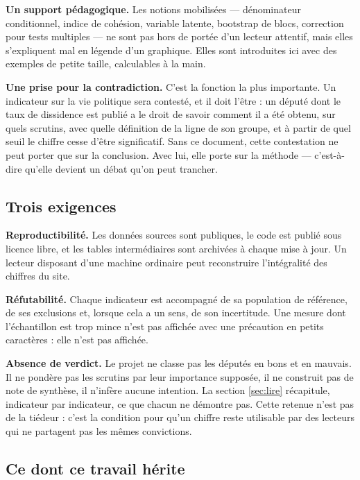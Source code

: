 \documentclass[11pt,a4paper]{article}
\begin{document}
\textbf{Un support pédagogique.} Les notions mobilisées — dénominateur
conditionnel, indice de cohésion, variable latente, bootstrap de blocs,
correction pour tests multiples — ne sont pas hors de portée d'un lecteur
attentif, mais elles s'expliquent mal en légende d'un graphique. Elles sont
introduites ici avec des exemples de petite taille, calculables à la main.

\textbf{Une prise pour la contradiction.} C'est la fonction la plus
importante. Un indicateur sur la vie politique sera contesté, et il doit
l'être : un député dont le taux de dissidence est publié a le droit de savoir
comment il a été obtenu, sur quels scrutins, avec quelle définition de la
ligne de son groupe, et à partir de quel seuil le chiffre cesse d'être
significatif. Sans ce document, cette contestation ne peut porter que sur la
conclusion. Avec lui, elle porte sur la méthode — c'est-à-dire qu'elle devient
un débat qu'on peut trancher.

\subsection{Trois exigences}

\textbf{Reproductibilité.} Les données sources sont publiques, le code est
publié sous licence libre, et les tables intermédiaires sont archivées à
chaque mise à jour. Un lecteur disposant d'une machine ordinaire peut
reconstruire l'intégralité des chiffres du site.

\textbf{Réfutabilité.} Chaque indicateur est accompagné de sa population de
référence, de ses exclusions et, lorsque cela a un sens, de son incertitude.
Une mesure dont l'échantillon est trop mince n'est pas affichée avec une
précaution en petits caractères : elle n'est pas affichée.

\textbf{Absence de verdict.} Le projet ne classe pas les députés en bons et en
mauvais. Il ne pondère pas les scrutins par leur importance supposée, il ne
construit pas de note de synthèse, il n'infère aucune intention. La section
\ref{sec:lire} récapitule, indicateur par indicateur, ce que chacun ne
démontre pas. Cette retenue n'est pas de la tiédeur : c'est la condition pour
qu'un chiffre reste utilisable par des lecteurs qui ne partagent pas les mêmes
convictions.

\subsection{Ce dont ce travail hérite}
\end{document}
